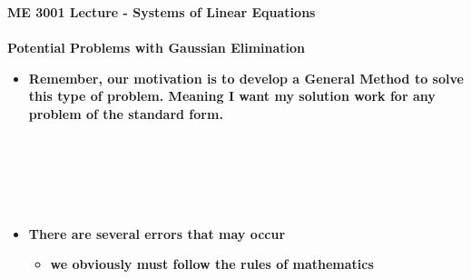 \documentclass[11pt]{article}
\newcommand{\B}{\color{blue}}
\newcommand{\PR}{\color{mypurple}}
\begin{document}
\textbf{ \LARGE ME 3001 Lecture - Systems of Linear Equations} \\\\
\textbf{ \LARGE Potential Problems with Gaussian Elimination } \\


 \renewcommand\labelitemi{\textbullet}
 \renewcommand\labelitemii{\textendash}
 \renewcommand\labelitemiii{\textasteriskcentered}
 \renewcommand\labelitemiv{\textperiodcentered}

\Large
\begin{itemize}

\item \textbf{  Remember, our motivation is to develop a {\B General Method} to solve this type of problem. Meaning I want my solution work for any problem of the {\PR standard form}.} \\\\

\\\\

\hspace*{15mm} \\\\


\item \textbf{  There are several errors that may occur} \\
	\begin{itemize}
		\item \textbf{ we obviously must follow the rules of mathematics}\vspace{20mm}\\
	

\end{itemize}
\end{itemize}
\end{document}
